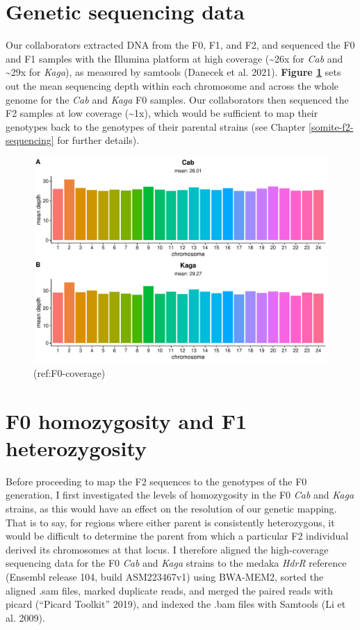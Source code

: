 \documentclass[
]{book}
\begin{document}
\hypertarget{genetic-sequencing-data}{%
\section{Genetic sequencing data}\label{genetic-sequencing-data}}

Our collaborators extracted DNA from the F0, F1, and F2, and sequenced the F0 and F1 samples with the Illumina platform at high coverage (\textasciitilde26x for \emph{Cab} and \textasciitilde29x for \emph{Kaga}), as measured by samtools (Danecek et al. 2021). \textbf{Figure \ref{fig:F0-coverage}} sets out the mean sequencing depth within each chromosome and across the whole genome for the \emph{Cab} and \emph{Kaga} F0 samples. Our collaborators then sequenced the F2 samples at low coverage (\textasciitilde1x), which would be sufficient to map their genotypes back to the genotypes of their parental strains (see Chapter \ref{somite-f2-sequencing} for further details).

\begin{figure}
\includegraphics[width=1\linewidth]{figs/somites/F0_coverage} \caption{(ref:F0-coverage)}\label{fig:F0-coverage}
\end{figure}

\hypertarget{f0-homozygosity-and-f1-heterozygosity}{%
\section{F0 homozygosity and F1 heterozygosity}\label{f0-homozygosity-and-f1-heterozygosity}}

Before proceeding to map the F2 sequences to the genotypes of the F0 generation, I first investigated the levels of homozygosity in the F0 \emph{Cab} and \emph{Kaga} strains, as this would have an effect on the resolution of our genetic mapping. That is to say, for regions where either parent is consistently heterozygous, it would be difficult to determine the parent from which a particular F2 individual derived its chromosomes at that locus. I therefore aligned the high-coverage sequencing data for the F0 \emph{Cab} and \emph{Kaga} strains to the medaka \emph{HdrR} reference (Ensembl release 104, build ASM223467v1) using BWA-MEM2, sorted the aligned .sam files, marked duplicate reads, and merged the paired reads with picard ({``Picard Toolkit''} 2019), and indexed the .bam files with Samtools (Li et al. 2009).
\end{document}
